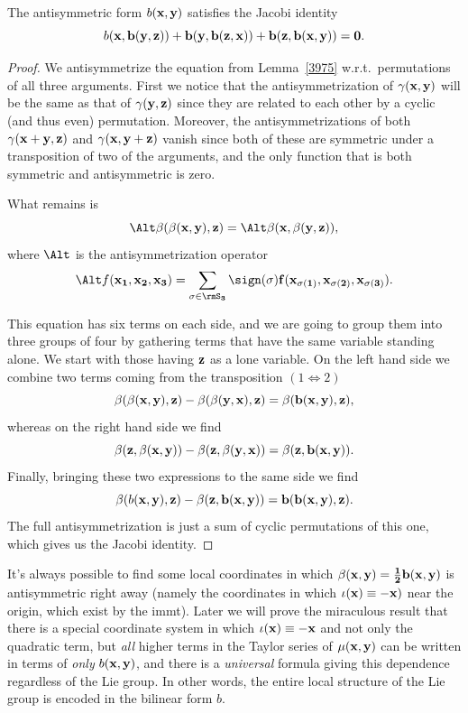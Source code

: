\begin{lem}
    The antisymmetric form $b(\bf{x},\bf{y})$ satisfies the Jacobi identity
    \[b(\bf{x},b(\bf{y},\bf{z}))+b(\bf{y},b(\bf{z},\bf{x}))+b(\bf{z},b(\bf{x},\bf{y}))=0.\]
\end{lem}
\begin{proof}
    We antisymmetrize the equation from Lemma~\ref{3975} w.r.t.\ permutations of all three arguments. First we notice that the antisymmetrization of $\gamma(\bf{x},\bf{y})$ will be the same as that of $\gamma(\bf{y},\bf{z})$ since they are related to each other by a cyclic (and thus even) permutation. Moreover, the antisymmetrizations of both $\gamma(\bf{x}+\bf{y},\bf{z})$ and $\gamma(\bf{x},\bf{y}+\bf{z})$ vanish since both of these are symmetric under a transposition of two of the arguments, and the only function that is both symmetric and antisymmetric is zero.

    What remains is 
    \[\Alt \beta(\beta(\bf{x},\bf{y}),\bf{z})=\Alt \beta(\bf{x},\beta(\bf{y},\bf{z})),\]
    where $\Alt$ is the antisymmetrization operator 
    \[\Alt f(\bf{x}_1,\bf{x}_2,\bf{x}_3)=\sum_{\sigma\in \rmS_3}\sign(\sigma)f(\bf{x}_{\sigma(1)},\bf{x}_{\sigma(2)},\bf{x}_{\sigma(3)}).\]

    This equation has six terms on each side, and we are going to group them into three groups of four by gathering terms that have the same variable standing alone. We start with those having $\bf{z}$ as a lone variable. On the left hand side we combine two terms coming from the transposition $(1\Leftrightarrow2)$
    \[\beta(\beta(\bf{x},\bf{y}),\bf{z})-\beta(\beta(\bf{y},\bf{x}),\bf{z})=\beta(b(\bf{x},\bf{y}),\bf{z}),\]
    whereas on the right hand side we find
    \[\beta(\bf{z},\beta(\bf{x},\bf{y}))-\beta(\bf{z},\beta(\bf{y},\bf{x}))=\beta(\bf{z},b(\bf{x},\bf{y})).\]
    Finally, bringing these two expressions to the same side we find
    \[\beta(b(\bf{x},\bf{y}),\bf{z})-\beta(\bf{z},b(\bf{x},\bf{y}))=b(b(\bf{x},\bf{y}),\bf{z}).\]
    The full antisymmetrization is just a sum of cyclic permutations of this one, which gives us the Jacobi identity.
\end{proof}

\begin{rem}
    It's always possible to find some local coordinates in which $\beta(\bf{x},\bf{y})=\frac12 b(\bf{x},\bf{y})$ is antisymmetric right away (namely the coordinates in which $\iota(\bf{x})\equiv -\bf{x})$ near the origin, which exist by the \gls{immt}). Later we will prove the miraculous result that there is a special coordinate system in which $\iota(\bf{x})\equiv-\bf{x}$ and not only the quadratic term, but \emph{all} higher terms in the Taylor series of $\mu(\bf{x},\bf{y})$ can be written in terms of \emph{only} $b(\bf{x},\bf{y})$, and there is a \emph{universal} formula giving this dependence regardless of the Lie group. In other words, the entire local structure of the Lie group is encoded in the bilinear form $b$.
\end{rem}




